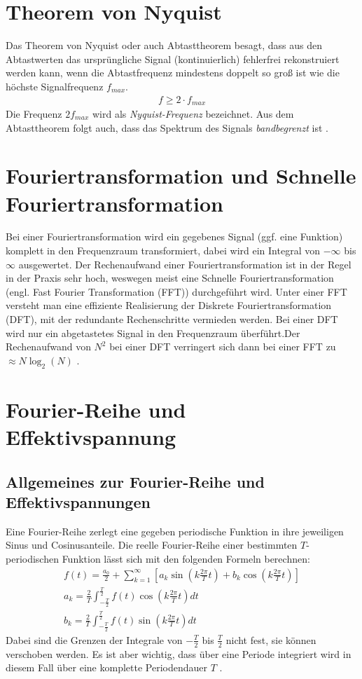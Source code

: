 \section{Theorem von Nyquist}
Das Theorem von Nyquist oder auch Abtasttheorem besagt, dass aus den Abtastwerten das ursprüngliche Signal (kontinuierlich) fehlerfrei rekonstruiert werden kann, wenn die Abtastfrequenz mindestens doppelt so groß ist wie die höchste Signalfrequenz $f_{max}$. 
\begin{gather}
    f \geq 2\cdot f_{max}
\end{gather} 
Die Frequenz $2f_{max}$ wird als \textit{Nyquist-Frequenz} bezeichnet. Aus dem Abtasttheorem folgt auch, dass das Spektrum des Signals \textit{bandbegrenzt} ist \citep{praktikum}.
\section{Fouriertransformation und Schnelle Fouriertransformation}
Bei einer Fouriertransformation wird ein gegebenes Signal (ggf. eine Funktion) komplett in den Frequenzraum transformiert, dabei wird ein Integral von $-\infty$ bis $\infty$ ausgewertet. Der Rechenaufwand einer Fouriertransformation ist in der Regel in der Praxis sehr hoch, weswegen meist eine Schnelle Fouriertransformation (engl. Fast Fourier Transformation (FFT)) durchgeführt wird. Unter einer FFT versteht man eine effiziente Realisierung der Diskrete Fouriertransformation (DFT), mit der redundante Rechenschritte vermieden werden. Bei einer DFT wird nur ein abgetastetes Signal in den Frequenzraum überführt.Der Rechenaufwand von $N^2$ bei einer DFT verringert sich dann  bei einer FFT zu $\approx N\log_2\left(N\right)$ \citep{praktikum}.
\section{Fourier-Reihe und Effektivspannung}
\label{sec:fourierseries}
\subsection*{Allgemeines zur Fourier-Reihe und Effektivspannungen}
\label{sub:fourierseriesAllgemein}
Eine Fourier-Reihe zerlegt eine gegeben periodische Funktion in ihre jeweiligen Sinus und Cosinusanteile. Die reelle Fourier-Reihe einer bestimmten $T$-periodischen Funktion lässt sich mit den folgenden Formeln berechnen:
\begin{gather}
    f(t) = \frac{a_0}{2} + \sum^{\infty}_{k=1} \left[a_k \sin(k\frac{2\pi}{T} t) +b_k \cos(k\frac{2\pi}{T} t)\right]\\
    a_k = \frac{2}{T} \int^{\frac{T}{2}}_{-\frac{T}{2}} f(t)\cos(k \frac{2\pi}{T} t)dt\\
    b_k = \frac{2}{T} \int^{\frac{T}{2}}_{-\frac{T}{2}} f(t)\sin(k \frac{2\pi}{T} t)dt
\end{gather}
Dabei sind die Grenzen der Integrale von $-\frac{T}{2}$ bis $\frac{T}{2}$ nicht fest, sie können verschoben werden. Es ist aber wichtig, dass über eine Periode integriert wird in diesem Fall über eine komplette Periodendauer $T$ \citep{praktikum}.\\

